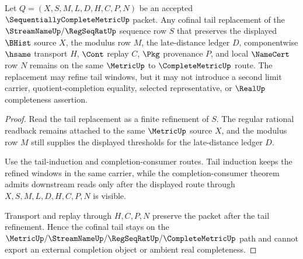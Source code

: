 \begin{theorem}
\label{thm:sequentially-complete-metric-cauchy-tail-stability}
Let $Q=(X,S,M,L,D,H,C,P,N)$ be an accepted $\SequentiallyCompleteMetricUp$ packet. Any cofinal tail replacement of the $\StreamNameUp/\RegSeqRatUp$ sequence row $S$ that preserves the displayed $\BHist$ source $X$, the modulus row $M$, the late-distance ledger $D$, componentwise $\hsame$ transport $H$, $\Cont$ replay $C$, $\Pkg$ provenance $P$, and local $\NameCert$ row $N$ remains on the same $\MetricUp$ to $\CompleteMetricUp$ route. The replacement may refine tail windows, but it may not introduce a second limit carrier, quotient-completion equality, selected representative, or $\RealUp$ completeness assertion.
\end{theorem}
\begin{proof}
Read the tail replacement as a finite refinement of $S$. The regular rational readback remains attached to the same $\MetricUp$ source $X$, and the modulus row $M$ still supplies the displayed thresholds for the late-distance ledger $D$.

Use the tail-induction and completion-consumer routes. Tail induction keeps the refined windows in the same carrier, while the completion-consumer theorem admits downstream reads only after the displayed route through $X,S,M,L,D,H,C,P,N$ is visible.

Transport and replay through $H,C,P,N$ preserve the packet after the tail refinement. Hence the cofinal tail stays on the $\MetricUp/\StreamNameUp/\RegSeqRatUp/\CompleteMetricUp$ path and cannot export an external completion object or ambient real completeness.
\end{proof}


